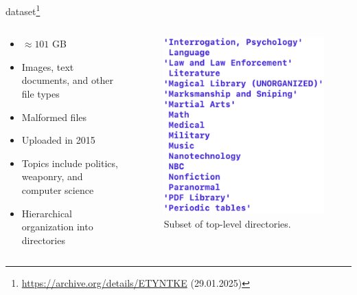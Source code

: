 \begin{frame}{\ac{dataset}\footnote{\url{https://archive.org/details/ETYNTKE} (29.01.2025)}}
    \begin{columns}[T] %
        \begin{column}{0.6\textwidth}
             \begin{itemize}
                \item $\approx 101$ GB 
                \item Images, text documents, and other file types
                \item Malformed files
                \item Uploaded in 2015
                \item Topics include politics, weaponry, and computer science
                \item Hierarchical organization into directories
            \end{itemize}
        \end{column}

        \begin{column}{0.25\textwidth}
            \begin{figure}
                \includegraphics[width=\linewidth]{images/screenshot_data.png}
                \caption{Subset of top-level directories.} %
            \end{figure}
   
        \end{column}
    \end{columns}
\end{frame}
